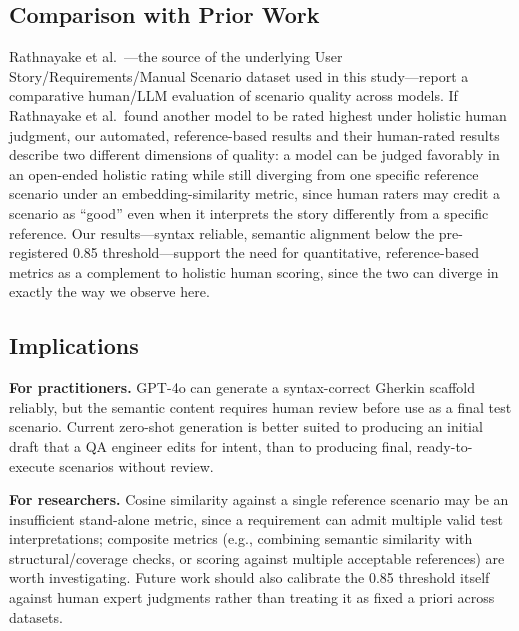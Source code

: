 \subsection{Comparison with Prior Work}
\label{sec:prior-work}

Rathnayake et al.~\cite{rathnayake2026llm}---the source of the underlying User Story/Requirements/Manual Scenario dataset used in this study---report a comparative human/LLM evaluation of scenario quality across models.
%
%
If Rathnayake et al.\ found another model to be rated highest under holistic human judgment, our automated, reference-based results and their human-rated results describe two different dimensions of quality: a model can be judged favorably in an open-ended holistic rating while still diverging from one specific reference scenario under an embedding-similarity metric, since human raters may credit a scenario as ``good'' even when it interprets the story differently from a specific reference.
Our results---syntax reliable, semantic alignment below the pre-registered 0.85 threshold---support the need for quantitative, reference-based metrics as a complement to holistic human scoring, since the two can diverge in exactly the way we observe here.

\subsection{Implications}
\label{sec:implications}

\textbf{For practitioners.}
GPT-4o can generate a syntax-correct Gherkin scaffold reliably, but the semantic content requires human review before use as a final test scenario.
Current zero-shot generation is better suited to producing an initial draft that a QA engineer edits for intent, than to producing final, ready-to-execute scenarios without review.

\textbf{For researchers.}
Cosine similarity against a single reference scenario may be an insufficient stand-alone metric, since a requirement can admit multiple valid test interpretations; composite metrics (e.g., combining semantic similarity with structural/coverage checks, or scoring against multiple acceptable references) are worth investigating.
Future work should also calibrate the 0.85 threshold itself against human expert judgments rather than treating it as fixed a priori across datasets.
